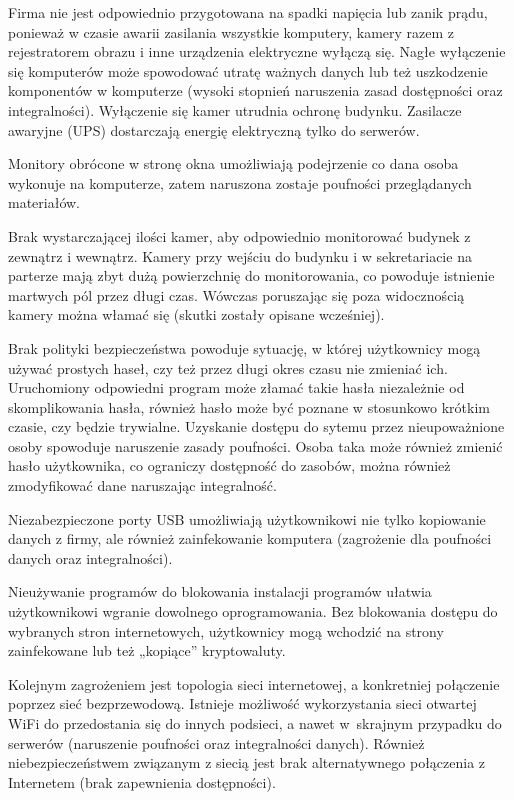 Firma nie jest odpowiednio przygotowana na spadki napięcia lub zanik prądu, ponieważ w czasie awarii zasilania wszystkie komputery, kamery \linebreak razem z rejestratorem obrazu i inne urządzenia elektryczne wyłączą się. Nagłe wyłączenie się komputerów może spowodować utratę ważnych danych lub też uszkodzenie komponentów w komputerze (wysoki stopnień naruszenia zasad dostępności oraz integralności). Wyłączenie się kamer utrudnia ochronę budynku. Zasilacze awaryjne (UPS) dostarczają energię elektryczną tylko do serwerów. 

Monitory obrócone w stronę okna umożliwiają podejrzenie co dana osoba wykonuje na komputerze, zatem naruszona zostaje poufności przeglądanych materiałów.

Brak wystarczającej ilości kamer, aby odpowiednio monitorować budynek z zewnątrz i wewnątrz. Kamery przy wejściu do budynku i w sekretariacie na parterze mają zbyt dużą powierzchnię do monitorowania, co powoduje istnienie martwych pól przez długi czas. Wówczas poruszając się poza widocznością kamery można włamać się (skutki zostały opisane wcześniej).  

Brak polityki bezpieczeństwa powoduje sytuację, w której użytkownicy mogą używać prostych haseł, czy też przez długi okres czasu nie zmieniać ich. Uruchomiony odpowiedni program może złamać takie hasła niezależnie od skomplikowania hasła, również hasło może być poznane w stosunkowo krótkim czasie, czy będzie trywialne. Uzyskanie dostępu do sytemu przez nieupoważnione osoby spowoduje naruszenie zasady poufności. Osoba taka może również zmienić hasło użytkownika, co ograniczy dostępność do zasobów, można również zmodyfikować dane naruszając integralność.

Niezabezpieczone porty USB umożliwiają użytkownikowi nie tylko kopiowanie danych z firmy, ale również zainfekowanie komputera (zagrożenie dla poufności danych oraz integralności).  

Nieużywanie programów do blokowania instalacji programów ułatwia użytkownikowi wgranie dowolnego oprogramowania. Bez blokowania  dostępu do wybranych stron internetowych, użytkownicy mogą wchodzić na strony zainfekowane lub też „kopiące” kryptowaluty.

Kolejnym zagrożeniem jest topologia sieci internetowej, a konkretniej połączenie poprzez sieć bezprzewodową. Istnieje możliwość wykorzystania sieci otwartej WiFi do przedostania się do innych podsieci, a nawet \linebreak w~skrajnym przypadku do serwerów (naruszenie poufności oraz integralności danych). Również niebezpieczeństwem \linebreak związanym z siecią jest brak alternatywnego połączenia z Internetem (brak zapewnienia dostępności).

